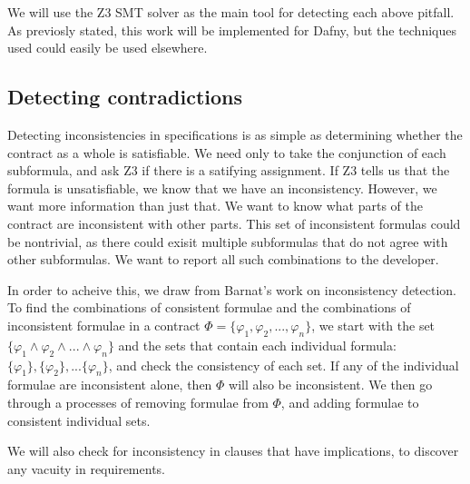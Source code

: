 \documentclass{article}
\newif\ifcomments
\newcommand{\egm}[1]{\ifcomments\textcolor{orange}{egm: #1}\fi}
\begin{document}
We will use the Z3 SMT solver as the main tool for detecting each above pitfall. As previosly stated,
this work will be implemented for Dafny, but the techniques used could easily be used elsewhere.

\subsection*{Detecting contradictions}
\egm{I now wonder if we should change inconsitencies to contradictions and use the term contradiction every where? Thoughts?}

Detecting inconsistencies in specifications is as simple as determining whether the contract as a whole is satisfiable.
We need only to take the conjunction of each subformula, and ask Z3 if there is a satifying assignment. If Z3 tells us that the
formula is unsatisfiable, we know that we have an inconsistency. However, we want more information than just that. We
want to know what parts of the contract are inconsistent with other parts. This set of inconsistent formulas could be
nontrivial, as there could exisit multiple subformulas that do not agree with other subformulas. We want to report all
such combinations to the developer.

In order to acheive this, we draw from Barnat's \cite{barnat2016analysing} work on inconsistency detection.
To find the combinations of consistent formulae and the combinations of inconsistent formulae in a contract
\(\Phi = \{\varphi_{1}, \varphi_{2}, ..., \varphi_{n}\}\), we start with the set \(\{\varphi_{1} \land \varphi_{2} \land ... \land \varphi_{n}\} \)
and the sets that contain each individual formula: \(\{\varphi_{1}\}, \{\varphi_{2}\}, ... \{\varphi_{n}\} \), and check
the consistency of each set. If any of the individual formulae are inconsistent alone, then \(\Phi\) will also be inconsistent.
We then go through a processes of removing formulae from \(\Phi\), and adding formulae to consistent individual sets.

We will also check for inconsistency in clauses that have implications, to discover any vacuity in requirements.
\egm{There should be some related work with what is called an \emph{unsat core} from the SMT literature. The issue is that when an SMT solver says there is not satisfying assignment, people want proof that such is really the case as it would be down to a defect in the SMT solver implementation. The unsat core is a proof certificate that the problem truly cannot be satisfied. It may be worth looking at some of the work with unsat cores.} 
\end{document}
